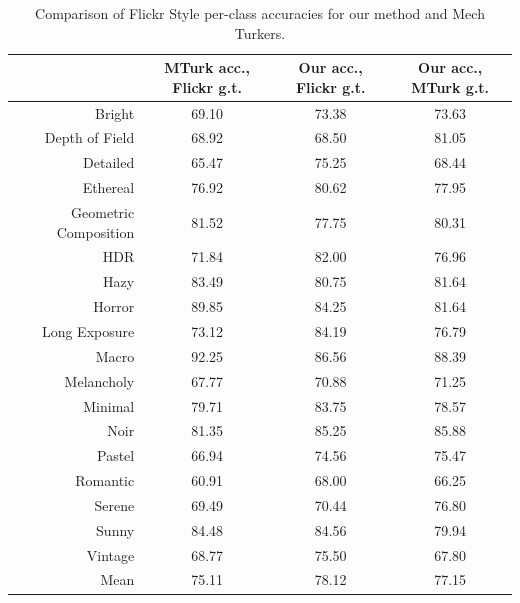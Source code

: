 \begin{table}[ht!]
\caption{Comparison of Flickr Style per-class accuracies for our method and Mech Turkers.}\label{tab:flickr_vs_mturk}
\centering
\small{
\begin{tabular}{rccc}
\toprule
{}                    & MTurk acc., Flickr g.t. & Our acc., Flickr g.t. & Our acc., MTurk g.t. \\
\midrule
Bright                & 69.10                       & 73.38                     & 73.63 \\
Depth of Field        & 68.92                       & 68.50                     & 81.05 \\
Detailed              & 65.47                       & 75.25                     & 68.44 \\
Ethereal              & 76.92                       & 80.62                     & 77.95 \\
Geometric Composition & 81.52                       & 77.75                     & 80.31 \\
HDR                   & 71.84                       & 82.00                     & 76.96 \\
Hazy                  & 83.49                       & 80.75                     & 81.64 \\
Horror                & 89.85                       & 84.25                     & 81.64 \\
Long Exposure         & 73.12                       & 84.19                     & 76.79 \\
Macro                 & 92.25                       & 86.56                     & 88.39 \\
Melancholy            & 67.77                       & 70.88                     & 71.25 \\
Minimal               & 79.71                       & 83.75                     & 78.57 \\
Noir                  & 81.35                       & 85.25                     & 85.88 \\
Pastel                & 66.94                       & 74.56                     & 75.47 \\
Romantic              & 60.91                       & 68.00                     & 66.25 \\
Serene                & 69.49                       & 70.44                     & 76.80 \\
Sunny                 & 84.48                       & 84.56                     & 79.94 \\
Vintage               & 68.77                       & 75.50                     & 67.80 \\
\midrule
Mean                  & 75.11                       & 78.12                     & 77.15 \\
\end{tabular}
}
\end{table}

